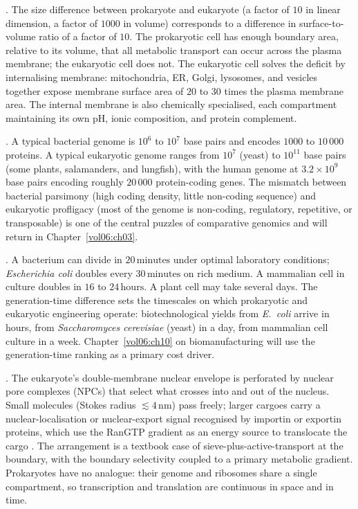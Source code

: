 

. The size difference between
prokaryote and eukaryote (a factor of $10$ in linear dimension, a
factor of $1000$ in volume) corresponds to a difference in surface-to-volume
ratio of a factor of $10$. The prokaryotic cell has enough
boundary area, relative to its volume, that all metabolic transport
can occur across the plasma membrane; the eukaryotic cell does not.
The eukaryotic cell solves the deficit by internalising membrane:
mitochondria, ER, Golgi, lysosomes, and vesicles together expose
membrane surface area of $20$ to $30$ times the plasma membrane area.
The internal membrane is also chemically specialised, each compartment
maintaining its own pH, ionic composition, and protein complement.

. A typical bacterial
genome is $10^6$ to $10^7$ base pairs and encodes $1000$ to $10\,000$
proteins. A typical eukaryotic genome ranges from $10^7$ (yeast) to
$10^{11}$ base pairs (some plants, salamanders, and lungfish), with
the human genome at $3.2 \times 10^9$ base pairs encoding roughly
$20\,000$ protein-coding genes. The mismatch between bacterial
parsimony (high coding density, little non-coding sequence) and
eukaryotic profligacy (most of the genome is non-coding,
regulatory, repetitive, or transposable) is one of the central
puzzles of comparative genomics and will return in Chapter~\ref{vol06:ch03}.

. A bacterium can divide in $20\,\text{minutes}$
under optimal laboratory conditions; \emph{Escherichia coli} doubles
every $30\,\text{minutes}$ on rich medium. A mammalian cell in
culture doubles in $16$ to $24\,\text{hours}$. A plant cell may take
several days. The generation-time difference sets the timescales on
which prokaryotic and eukaryotic engineering operate:
biotechnological yields from \emph{E.~coli} arrive in hours, from
\emph{Saccharomyces cerevisiae} (yeast) in a day, from mammalian
cell culture in a week. Chapter~\ref{vol06:ch10} on biomanufacturing
will use the generation-time ranking as a primary cost driver.

. The eukaryote's
double-membrane nuclear envelope is perforated by nuclear pore
complexes (NPCs) that select what crosses into and out of the
nucleus. Small molecules (Stokes radius $\lesssim 4\,\text{nm}$) pass
freely; larger cargoes carry a nuclear-localisation or nuclear-export
signal recognised by importin or exportin proteins, which use the
RanGTP gradient as an energy source to translocate the cargo
\cite{paper:v6c01-paine-1975}. The arrangement is a textbook case of
sieve-plus-active-transport at the boundary, with the boundary
selectivity coupled to a primary metabolic gradient. Prokaryotes
have no analogue: their genome and ribosomes share a single
compartment, so transcription and translation are continuous in
space and in time.

